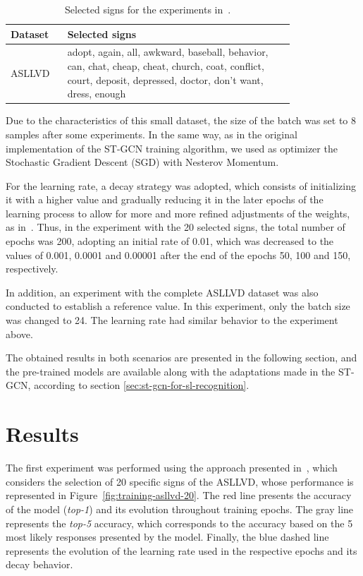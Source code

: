 \begin{table}[ht]
\centering
\caption{Selected signs for the experiments in~\cite{lim-2016}.}
\label{tab:asllvd-20}
\begin{tabular}{ l | p{0.8\linewidth} }
\hline
Dataset & Selected signs \\ \hline
ASLLVD & adopt, again, all, awkward, baseball, behavior, can, chat, cheap, cheat, church, coat, conflict, court, deposit, depressed, doctor, don’t want, dress, enough \\ \hline
\end{tabular}
\end{table}

Due to the characteristics of this small dataset, the size of the batch was set to 8 samples after some experiments. 
In the same way, as in the original implementation of the ST-GCN training algorithm, we used as optimizer the Stochastic Gradient Descent (SGD) with Nesterov Momentum. 

For the learning rate, a decay strategy was adopted, which consists of initializing it with a higher value and gradually reducing it in the later epochs of the learning process to allow for more and more refined adjustments of the weights, as in~\cite{st-gcn-2018}. Thus, in the experiment with the 20 selected signs, the total number of epochs was 200, adopting an initial rate of 0.01, which was decreased to the values of 0.001, 0.0001 and 0.00001 after the end of the epochs 50, 100 and 150, respectively.

In addition, an experiment with the complete ASLLVD dataset was also conducted to establish a reference value. In this experiment, only the batch size was changed to 24. The learning rate had similar behavior to the experiment above.

The obtained results in both scenarios are presented in the following section, and the pre-trained models are available along with the adaptations made in the ST-GCN, according to section \ref{sec:st-gcn-for-sl-recognition}.


\section{Results} 
\label{sec:results}

The first experiment was performed using the approach presented in~\cite{lim-2016}, which considers the selection of 20 specific signs of the ASLLVD, whose performance is represented in Figure~\ref{fig:training-asllvd-20}. The red line presents the accuracy of the model (\textit{top-1}) and its evolution throughout training epochs. The gray line represents the \textit{top-5} accuracy, which corresponds to the accuracy based on the 5 most likely responses presented by the model. Finally, the blue dashed line represents the evolution of the learning rate used in the respective epochs and its decay behavior.

